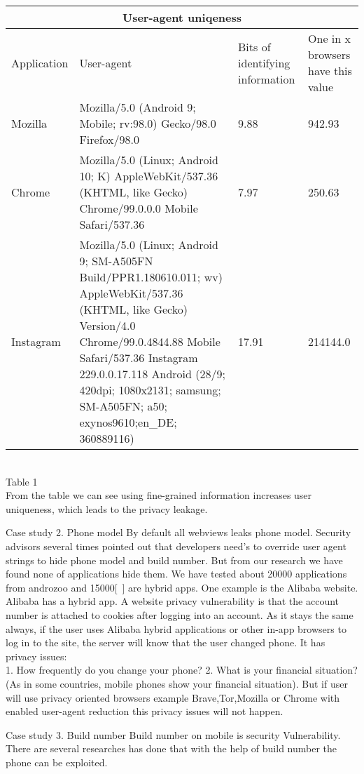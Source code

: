 \begin{tabular}{ |p{3cm}||p{3cm}|p{3cm}|p{3cm} |}
 \hline
 \multicolumn{4}{|c|}{User-agent uniqeness} \\
 \hline
Application & User-agent& Bits of identifying information& One in x browsers have this value\\
 \hline
Mozilla & Mozilla/5.0 (Android 9; Mobile; rv:98.0) Gecko/98.0 Firefox/98.0& 9.88 & 942.93\\
 \hline
Chrome & Mozilla/5.0 (Linux; Android 10; K) AppleWebKit/537.36 (KHTML, like Gecko) Chrome/99.0.0.0 Mobile Safari/537.36 & 7.97 & 250.63\\
 \hline
Instagram & Mozilla/5.0 (Linux; Android 9; SM-A505FN Build/PPR1.180610.011; wv) AppleWebKit/537.36 (KHTML, like Gecko) Version/4.0  Chrome/99.0.4844.88 Mobile Safari/537.36 Instagram 229.0.0.17.118  Android (28/9; 420dpi; 1080x2131;           samsung; SM-A505FN; a50; exynos9610;en\_DE; 360889116) &17.91 & 214144.0\\
\hline
\end{tabular}\\
  Table 1 
 \\
From the table we can see using fine-grained information increases user uniqueness, which leads to the privacy leakage.

Case study 2. Phone model 
By default all webviews leaks phone model. Security advisors several times pointed out that developers need's to override user agent strings to hide phone model and build number\cite{forum}\cite{nightwatch}\cite{nightwatch1}. But from our research we have found none of applications hide them. We have tested about 20000 applications from androzoo and 15000[~] are hybrid apps. 
One example is the Alibaba website. Alibaba has a hybrid app. A website privacy vulnerability is that the account number is attached to cookies after logging into an account. As it stays the same always, if the user uses Alibaba hybrid applications or other in-app browsers to log in to the site, the server will know that the user changed phone. It has privacy issues:\\
1. How frequently do you change your phone?
2. What is your financial situation? (As in some countries, mobile phones show your financial situation).
But if user will use privacy oriented browsers example Brave,Tor,Mozilla or Chrome with enabled user-agent reduction this privacy issues will not happen. 

Case study 3. Build number 
Build number on mobile is security Vulnerability. There are several researches has done that with the help of build number the phone can be exploited\cite{nightwatch02}.

